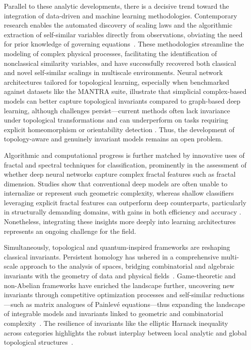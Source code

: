 \documentclass[sigconf]{acmart}
\begin{document}
Parallel to these analytic developments, there is a decisive trend toward the integration of data-driven and machine learning methodologies. Contemporary research enables the automated discovery of scaling laws and the algorithmic extraction of self-similar variables directly from observations, obviating the need for prior knowledge of governing equations~\cite{ref30,ref65}. These methodologies streamline the modeling of complex physical processes, facilitating the identification of nonclassical similarity variables, and have successfully recovered both classical and novel self-similar scalings in multiscale environments. Neural network architectures tailored for topological learning, especially when benchmarked against datasets like the MANTRA suite, illustrate that simplicial complex-based models can better capture topological invariants compared to graph-based deep learning, although challenges persist—current methods often lack invariance under topological transformations and can underperform on tasks requiring explicit homeomorphism or orientability detection \cite{ref26}. Thus, the development of topology-aware and genuinely invariant models remains an open problem.

Algorithmic and computational progress is further matched by innovative uses of fractal and spectral techniques for classification, prominently in the assessment of whether deep neural networks capture complex fractal features such as fractal dimension. Studies show that conventional deep models are often unable to internalize or represent such geometric complexity, whereas shallow classifiers leveraging explicit fractal features can outperform deep counterparts, particularly in structurally demanding domains, with gains in both efficiency and accuracy \cite{ref39,ref54}. Nonetheless, integrating these insights more deeply into learning architectures represents an ongoing challenge for the field.

Simultaneously, topological and quantum-inspired frameworks are reshaping classical invariants. Persistent homology has ushered in a comprehensive multi-scale approach to the analysis of spaces, bridging combinatorial and algebraic invariants with the geometry of data and physical fields~\cite{ref62}. Game-theoretic and non-Abelian frameworks have enriched the landscape further, uncovering new invariants through competitive optimization processes and self-similar reductions—such as matrix analogues of Painlevé equations—thus expanding the landscape of integrable models and invariants linked to geometric and combinatorial complexity~\cite{ref55,ref63}. The resilience of invariants like the elliptic Harnack inequality across categories highlights the robust interplay between local analytic and global topological structures~\cite{ref40}.
\end{document}
